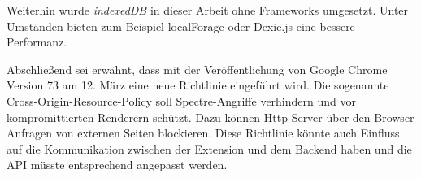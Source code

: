 Weiterhin wurde \textit{indexedDB} in dieser Arbeit ohne Frameworks umgesetzt. Unter Umständen bieten zum Beispiel \glqq localForage \grqq{}\cite{forage} oder \glqq Dexie.js \grqq{}\cite{dexie} eine bessere Performanz.

Abschließend sei erwähnt, dass mit der Veröffentlichung von Google Chrome Version 73 am 12. März eine neue Richtlinie eingeführt wird. Die sogenannte \glqq Cross-Origin-Resource-Policy \grqq{}\cite{corb} soll \glqq Spectre\grqq{}-Angriffe\cite{spectre} verhindern und vor kompromittierten Renderern schützt. Dazu können Http-Server über den Browser Anfragen von externen Seiten blockieren. Diese Richtlinie könnte auch Einfluss auf die Kommunikation zwischen der Extension und dem Backend haben und die API müsste entsprechend angepasst werden.













